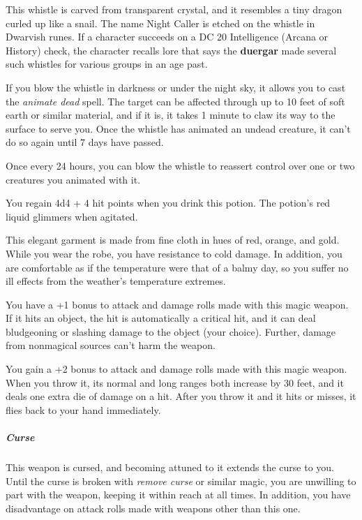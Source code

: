 \documentclass[10pt,a4paper,twoside,bg=print,twocolumn,openany,nodeprecatedcode]{dndbook}
\begin{document}
This whistle is carved from transparent crystal, and it resembles a tiny dragon curled up like a snail. The name Night Caller is etched on the whistle in Dwarvish runes. If a character succeeds on a DC 20 Intelligence (Arcana or History) check, the character recalls lore that says the \textbf{duergar} made several such whistles for various groups in an age past.

If you blow the whistle in darkness or under the night sky, it allows you to cast the \textit{animate dead} spell. The target can be affected through up to 10 feet of soft earth or similar material, and if it is, it takes 1 minute to claw its way to the surface to serve you. Once the whistle has animated an undead creature, it can't do so again until 7 days have passed.

Once every 24 hours, you can blow the whistle to reassert control over one or two creatures you animated with it.

You regain 4d4 + 4 hit points when you drink this potion. The potion's red liquid glimmers when agitated.

This elegant garment is made from fine cloth in hues of red, orange, and gold. While you wear the robe, you have resistance to cold damage. In addition, you are comfortable as if the temperature were that of a balmy day, so you suffer no ill effects from the weather's temperature extremes.

You have a +1 bonus to attack and damage rolls made with this magic weapon. If it hits an object, the hit is automatically a critical hit, and it can deal bludgeoning or slashing damage to the object (your choice). Further, damage from nonmagical sources can't harm the weapon.

You gain a +2 bonus to attack and damage rolls made with this magic weapon. When you throw it, its normal and long ranges both increase by 30 feet, and it deals one extra die of damage on a hit. After you throw it and it hits or misses, it flies back to your hand immediately.

\subparagraph{Curse}
This weapon is cursed, and becoming attuned to it extends the curse to you. Until the curse is broken with \textit{remove curse} or similar magic, you are unwilling to part with the weapon, keeping it within reach at all times. In addition, you have disadvantage on attack rolls made with weapons other than this one.
\end{document}
